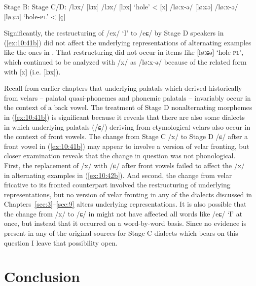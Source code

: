 \begin{xlist}
\ea%
\label{ex:10:42}
\begin{xlist}
\sn{}     Stage B:            \tab  Stage C/D:       \tab
\ex\label{ex:10:42a}  /lɔx/       [lɔx]   \tab /lɔx/       [lɔx] \tab ‘hole’  \tab < [x]
\ex\label{ex:10:42b}  /løːx-ǝ/    [løːɕǝ] \tab /løːx-ǝ/  [løːɕǝ] \tab ‘hole-\textsc{pl}’ \tab < [ç]
\end{xlist}
\z 

Significantly, the restructuring of /ex/ ‘I’ to /eɕ/ by Stage D speakers in (\ref{ex:10:41b}) did not affect the underlying representations of alternating examples like the ones in . That restructuring did not occur in items like [løːɕǝ] ‘hole-\textsc{pl}’, which continued to be analyzed with /x/ as /løːx-ǝ/ because of the related form with [x] (i.e. [lɔx]).

Recall from earlier chapters that underlying palatals which derived historically from velars -- palatal quasi-phonemes and phonemic palatals -- invariably occur in the context of a back vowel. The treatment of Stage D nonalternating morphemes in (\ref{ex:10:41b}) is significant because it reveals that there are also some dialects in which underlying palatals (/ɕ/) deriving from etymological velars also occur in the context of front vowels. The change from Stage C /x/ to Stage D /ɕ/ after a front vowel in (\ref{ex:10:41b}) may appear to involve a version of velar fronting, but closer examination reveals that the change in question was not phonological. First, the replacement of /x/ with /ɕ/ after front vowels failed to affect the /x/ in alternating examples in (\ref{ex:10:42b}). And second, the change from velar fricative to its fronted counterpart involved the restructuring of underlying representations, but no version of velar fronting in any of the dialects discussed in Chapters~\ref{sec:3}--\ref{sec:9} alters underlying representations. It is also possible that the change from /x/ to /ɕ/ in  might not have affected all words like /eɕ/ ‘I’ at once, but instead that it occurred on a word-by-word basis. Since no evidence is present in any of the original sources for Stage C dialects which bears on this question I leave that possibility open.

\section{{Conclusion}}\label{sec:10.7}


\end{xlist}
